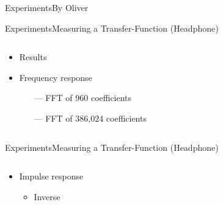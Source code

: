 \begin{frame}{Experiments}{By Oliver}
\begin{frame}{Experiments}{Measuring a Transfer-Function (Headphone)}		
	\begin{columns}
		\begin{column}{0.3\textwidth}
			\begin{itemize}
				\item Results
				\item Frequency response
				\begin{itemize}
					\item[\textcolor{MATLABorange}{---}] FFT of 960 coefficients
					\item[\textcolor{MATLABblue}{---}] FFT of 386,024 coefficients
				\end{itemize}
			\end{itemize}
		\end{column}
		\begin{column}{0.7\textwidth} 
			\begin{figure}[h]
				
			\end{figure}
		\end{column}
	\end{columns}
\end{frame}
\begin{frame}{Experiments}{Measuring a Transfer-Function (Headphone)}		
	\begin{columns}
		\begin{column}{1\textwidth}
			\begin{itemize}
				\item Impulse response
				\begin{itemize}
					\item Inverse
				\end{itemize}
			\end{itemize}
			\begin{figure}[h]
				
			\end{figure}
		\end{column}
	\end{columns}
\end{frame}



\end{frame}
